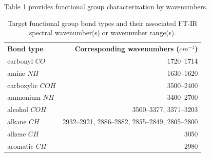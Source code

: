Table \ref{tab:bonds} provides functional group characterization by wavenumbers.

\begin{table}[H]
    \centering
    \begin{tabular}{l r}
         \textbf{Bond type} & \textbf{Corresponding wavenumbers ($cm^{-1}$)}\cite{Satoshi1} \\
         carbonyl $CO$ & 1720--1714 \\
         amine $NH$ & 1630--1620 \\
         carboxylic $COH$ & 3500--2400 \\
         ammonium $NH$ & 3400--2700 \\
         alcohol $COH$ & 3500--3377, 3371--3203 \\
         alkane $CH$ & 2932--2921, 2886--2882, 2855--2849, 2805--2800 \\
         alkene $CH$ & 3050 \\
         aromatic $CH$ & 2980 \\
    \end{tabular}
    \caption{Target functional group bond types and their associated FT-IR spectral wavenumber(s) or wavenumber range(s).}
    \label{tab:bonds}
\end{table}

